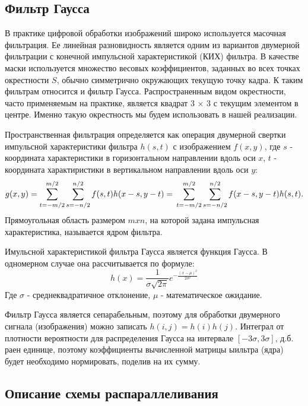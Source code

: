 \documentclass{article}
\begin{document}
\subsection*{Фильтр Гаусса}
\par
В практике цифровой обработки изображений широко используется
масочная фильтрация. Ее линейная разновидность является одним из
вариантов двумерной фильтрации с конечной импульсной
характеристикой (КИХ) фильтра. В качестве маски используется
множество весовых коэффициентов, заданных во всех точках окрестности
$S$, обычно симметрично окружающих текущую точку кадра. К таким фильтрам относится и фильтр Гаусса.
Распространенным видом окрестности, часто применяемым на практике,
является квадрат 3 × 3 с текущим элементом в центре. Именно такую окрестность мы будем использовать в нашей реализации.
\par
Пространственная фильтрация определяется как операция двумерной свертки импульсной характеристики фильтра $h(s, t)$ с изображением $f(x, y)$, где $s$ - координата характеристики в горизонтальном направлении вдоль оси $x$, $t$ - координата характиристики в вертикальном направлении вдоль оси $y$:
$$g(x,y) = \sum_{t = -m/2}^{m/2} \sum_{s = -n/2}^{n/2} f(s,t) h(x - s, y - t) = 
\\
\sum_{t = -m/2}^{m/2} \sum_{s = -n/2}^{n/2} f(x - s, y - t) h(s, t).
$$
Прямоугольная область размером $m x n$, на которой задана импульсная характеристика, называется ядром фильтра.
\par
Имульсной характеристикой фильтра Гаусса является функция Гаусса. В одномерном случае она рассчитывается по формуле:
$$h(x) = \frac{1}{\sigma \sqrt{2 \pi}} e^{-\frac{(x - \mu)^2}{2 \sigma^2}}$$
Где $\sigma$ - среднеквадратичное отклонение, $\mu$ - математическое ожидание.
\par
Фильтр Гаусса является сепарабельным, поэтому для обработки двумерного сигнала (изображения) можно записать $h(i, j) = h(i) h(j)$. Интеграл от плотности вероятности для распределения Гаусса на интервале $[-3\sigma, 3\sigma]$, д.б. раен единице, поэтому коэффициенты вычисленной матрицы ыильтра (ядра) будет необходимо нормировать, поделив на их сумму.

\newpage

\subsection*{Описание схемы распараллеливания}
\end{document}
